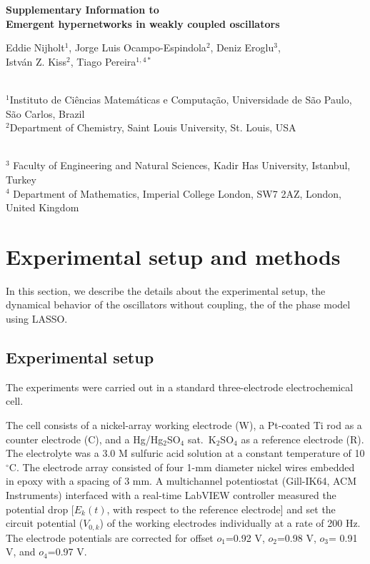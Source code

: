 \documentclass[12pt]{article}
\theoremstyle{plain}
\theoremstyle{definition}
\theoremstyle{remark}
\theoremstyle{remark}
\begin{document}
\begin{center}
{\large \bf Supplementary Information to \\
Emergent hypernetworks in weakly coupled oscillators} \\
\vspace{1cm}
{ Eddie Nijholt$^{1}$, Jorge Luis  Ocampo-Espindola$^{2}$,  Deniz Eroglu$^{3}$, \\ Istv\'{a}n Z. Kiss$^{2}$,  Tiago Pereira$^{1,4\ast}$\\~\\

{

$^1$Instituto de Ci\^encias Matem\'aticas e Computa\c{c}\~ao, Universidade de S\~ao Paulo, S\~ao Carlos, Brazil \\
\vspace{0.2cm}
$^{2}$Department of Chemistry, Saint Louis University, St. Louis, USA} \\
\vspace{0.2cm}
$^3$ Faculty of Engineering and Natural Sciences, Kadir Has University, Istanbul, Turkey \\
\vspace{0.2cm}
$^4$ Department of Mathematics, Imperial College London, SW7 2AZ, London, United Kingdom}
\end{center}




\renewcommand\contentsname{Supplementary Notes}
\tableofcontents


\newpage

\section{Experimental setup and methods}\label{Sec_exp}
In this section, we describe the details about the experimental setup, the dynamical behavior of the oscillators without coupling, the 
of the phase model using LASSO.

\subsection{Experimental setup} 
The experiments were carried out in a standard three-electrode electrochemical cell. 

The cell consists of a nickel-array working electrode (W), a Pt-coated Ti rod as a counter electrode (C), and a Hg/Hg$_2$SO$_4$ sat.~K$_2$SO$_4$ as a reference electrode (R). The electrolyte was a 3.0 M sulfuric acid solution at a constant temperature of 10 $^{\circ}$C. The electrode array consisted of four 1-mm diameter nickel wires embedded in epoxy with a spacing of 3 mm. A multichannel potentiostat (Gill-IK64, ACM Instruments) interfaced with a real-time LabVIEW controller measured the potential drop $[E_k(t)$, with 
respect to the reference electrode] and set the circuit potential ($V_{0, k}$) of the working electrodes individually at a rate of 200 Hz. The electrode potentials are corrected for offset $o_1$=0.92 V, $o_2$=0.98 V, $o_3$= 0.91 V, and $o_4$=0.97 V. 
 
\end{document}
